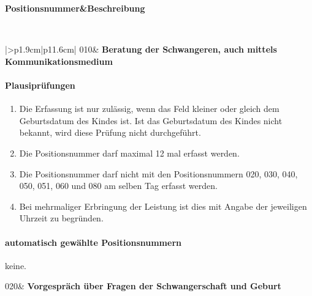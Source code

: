 \tablehead
{\hline \bfseries Positions\-nummer&\bfseries Beschreibung\\ \hline}

\tabletail
{\hline {}\\}

\tablelasttail{\hline}
\begin{mpsupertabular}{|>{\centering}p{1.9cm}|p{11.6cm}|}
010&
\textbf{Beratung der Schwangeren, auch mittels Kommunikationsmedium}
\paragraph{Plausiprüfungen}
\begin{enumerate}
\item
Die Erfassung ist nur zulässig, wenn das Feld  kleiner 
oder gleich dem Geburtsdatum des Kindes ist. Ist das Geburtsdatum des
Kindes nicht bekannt, wird diese Prüfung nicht durchgeführt.
\item
Die Positionsnummer darf maximal 12 mal erfasst werden.
\item
Die Positionsnummer darf nicht mit den Positionsnummern 020, 030, 040, 050,
051, 060 und 080 am
selben Tag erfasst werden.
\item 
Bei mehrmaliger Erbringung der Leistung ist dies mit Angabe der jeweiligen
Uhrzeit zu begründen.
\end{enumerate}
\paragraph{automatisch gewählte Positionsnummern}
keine.
\\ \hline


020&
\textbf{Vorgespräch über Fragen der Schwangerschaft und Geburt}

\end{mpsupertabular}
